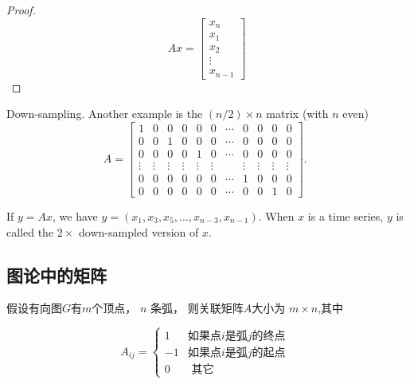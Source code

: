 \begin{proof}
    \begin{equation} A x=\left[\begin{array}{c}x_{n} \\ x_{1} \\ x_{2} \\ \vdots \\ x_{n-1}\end{array}\right] \end{equation}
\end{proof}

\begin{definition}[Downsampling]
    Down-sampling. Another example is the $ (n / 2) \times n $ matrix (with $ n $ even)
\begin{equation}
A=\left[\begin{array}{ccccccccccc}
1 & 0 & 0 & 0 & 0 & 0 & \cdots & 0 & 0 & 0 & 0 \\
0 & 0 & 1 & 0 & 0 & 0 & \cdots & 0 & 0 & 0 & 0 \\
0 & 0 & 0 & 0 & 1 & 0 & \cdots & 0 & 0 & 0 & 0 \\
\vdots & \vdots & \vdots & \vdots & \vdots & \vdots & & \vdots & \vdots & \vdots & \vdots \\
0 & 0 & 0 & 0 & 0 & 0 & \cdots & 1 & 0 & 0 & 0 \\
0 & 0 & 0 & 0 & 0 & 0 & \cdots & 0 & 0 & 1 & 0
\end{array}\right] \text {. }
\end{equation}
\end{definition}

\begin{example}
    If $ y=A x $, we have $ y=\left(x_{1}, x_{3}, x_{5}, \ldots, x_{n-3}, x_{n-1}\right) $. When $ x $ is a time series, $ y $ is called the $ 2 \times $ down-sampled version of $ x $.
\end{example}

\subsection{图论中的矩阵}


\begin{definition}[关联矩阵]
   假设有向图$G$有$m$个顶点，  $ n $ 条弧， 则关联矩阵$A$大小为 $ m \times n $,其中 

   \begin{equation} A_{i j}=\left\{\begin{array}{ll}1 & \text{如果点} i \text{是弧} j \text{的终点 } \\ -1 & \text {如果点}i \text{是弧}j \text{的起点} \\ 0 & \text { 其它 }\end{array}\right. \end{equation}
\end{definition}

